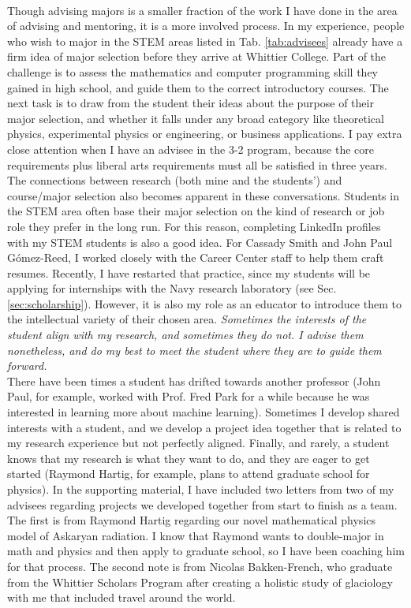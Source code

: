\documentclass[../../../main.tex]{subfiles}
\begin{document}
\\
\vspace{0.25cm}
Though advising majors is a smaller fraction of the work I have done in the area of advising and mentoring, it is a more involved process.  In my experience, people who wish to major in the STEM areas listed in Tab. \ref{tab:advisees} already have a firm idea of major selection before they arrive at Whittier College.  Part of the challenge is to assess the mathematics and computer programming skill they gained in high school, and guide them to the correct introductory courses.  The next task is to draw from the student their ideas about the purpose of their major selection, and whether it falls under any broad category like theoretical physics, experimental physics or engineering, or business applications.  I pay extra close attention when I have an advisee in the 3-2 program, because the core requirements plus liberal arts requirements must all be satisfied in three years.
\\
\vspace{0.25cm}
The connections between research (both mine and the students') and course/major selection also becomes apparent in these conversations.  Students in the STEM area often base their major selection on the kind of research or job role they prefer in the long run.  For this reason, completing LinkedIn profiles with my STEM students is also a good idea.  For Cassady Smith and John Paul G\'{o}mez-Reed, I worked closely with the Career Center staff to help them craft resumes.  Recently, I have restarted that practice, since my students will be applying for internships with the Navy research laboratory (see Sec. \ref{sec:scholarship}).  However, it is also my role as an educator to introduce them to the intellectual variety of their chosen area.  \textit{Sometimes the interests of the student align with my research, and sometimes they do not.  I advise them nonetheless, and do my best to meet the student where they are to guide them forward.}
\vspace{0.25cm}
\\
There have been times a student has drifted towards another professor (John Paul, for example, worked with Prof. Fred Park for a while because he was interested in learning more about machine learning).  Sometimes I develop shared interests with a student, and we develop a project idea together that is related to my research experience but not perfectly aligned.  Finally, and rarely, a student knows that my research is what they want to do, and they are eager to get started (Raymond Hartig, for example, plans to attend graduate school for physics).  In the supporting material, I have included two letters from two of my advisees regarding projects we developed together from start to finish as a team.  The first is from Raymond Hartig regarding our novel mathematical physics model of Askaryan radiation.  I know that Raymond wants to double-major in math and physics and then apply to graduate school, so I have been coaching him for that process.  The second note is from Nicolas Bakken-French, who graduate from the Whittier Scholars Program after creating a holistic study of glaciology with me that included travel around the world.
\end{document}
